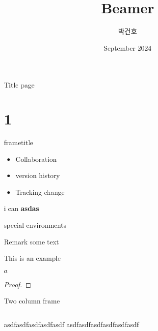 \documentclass[12pt]{beamer}
\title{Beamer}
\author{박건호}
\date{September 2024}
\begin{document}
\maketitle

\begin{frame}{Title page}   
\tableofcontents
\end{frame}

\section{1}
\begin{frame}{frametitle}

\begin{itemize}
    \item<1-> Collaboration
    \item<2-> version history
    \item<3-> Tracking change
\end{itemize}


\alert<1>{i can}  \textbf<2>{asdas}

\end{frame}

\begin{frame}{special environments}
    \begin{block}{Remark}  
    some text
    \end{block}

    \begin{example}
    This is an example
    \end{example}

    \begin{theorem}[Pythagoras]
    $a$
    \end{theorem}

    \begin{proof}
    
    \end{proof}
    
\end{frame}

\begin{frame}{Two column frame}

    \begin{columns}
     asdfasdfasdfasdfasdf
    asdfasdfasdfasdfasdfasdf
    \end{columns}
\end{frame}
\end{document}

